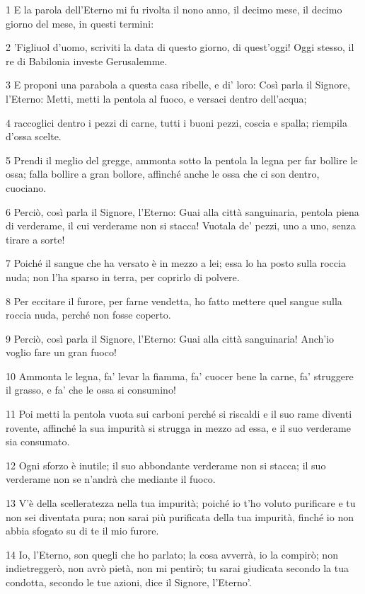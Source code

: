 \par 1 E la parola dell'Eterno mi fu rivolta il nono anno, il decimo mese, il decimo giorno del mese, in questi termini:
\par 2 'Figliuol d'uomo, scriviti la data di questo giorno, di quest'oggi! Oggi stesso, il re di Babilonia investe Gerusalemme.
\par 3 E proponi una parabola a questa casa ribelle, e di' loro: Così parla il Signore, l'Eterno: Metti, metti la pentola al fuoco, e versaci dentro dell'acqua;
\par 4 raccoglici dentro i pezzi di carne, tutti i buoni pezzi, coscia e spalla; riempila d'ossa scelte.
\par 5 Prendi il meglio del gregge, ammonta sotto la pentola la legna per far bollire le ossa; falla bollire a gran bollore, affinché anche le ossa che ci son dentro, cuociano.
\par 6 Perciò, così parla il Signore, l'Eterno: Guai alla città sanguinaria, pentola piena di verderame, il cui verderame non si stacca! Vuotala de' pezzi, uno a uno, senza tirare a sorte!
\par 7 Poiché il sangue che ha versato è in mezzo a lei; essa lo ha posto sulla roccia nuda; non l'ha sparso in terra, per coprirlo di polvere.
\par 8 Per eccitare il furore, per farne vendetta, ho fatto mettere quel sangue sulla roccia nuda, perché non fosse coperto.
\par 9 Perciò, così parla il Signore, l'Eterno: Guai alla città sanguinaria! Anch'io voglio fare un gran fuoco!
\par 10 Ammonta le legna, fa' levar la fiamma, fa' cuocer bene la carne, fa' struggere il grasso, e fa' che le ossa si consumino!
\par 11 Poi metti la pentola vuota sui carboni perché si riscaldi e il suo rame diventi rovente, affinché la sua impurità si strugga in mezzo ad essa, e il suo verderame sia consumato.
\par 12 Ogni sforzo è inutile; il suo abbondante verderame non si stacca; il suo verderame non se n'andrà che mediante il fuoco.
\par 13 V'è della scelleratezza nella tua impurità; poiché io t'ho voluto purificare e tu non sei diventata pura; non sarai più purificata della tua impurità, finché io non abbia sfogato su di te il mio furore.
\par 14 Io, l'Eterno, son quegli che ho parlato; la cosa avverrà, io la compirò; non indietreggerò, non avrò pietà, non mi pentirò; tu sarai giudicata secondo la tua condotta, secondo le tue azioni, dice il Signore, l'Eterno'.

